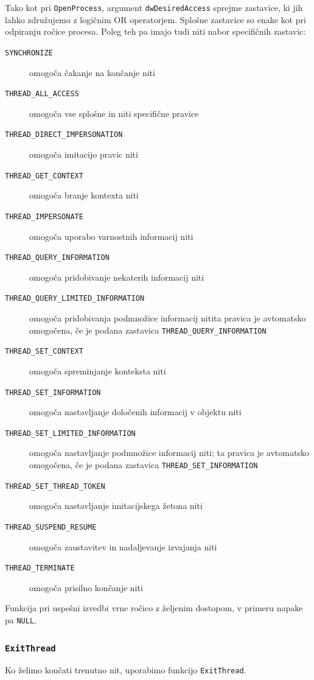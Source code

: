 \documentclass[a4paper,12pt,openright]{book}
\begin{document}
Tako kot pri \texttt{OpenProcess}, argument \texttt{dwDesiredAccess} sprejme zastavice, ki jih lahko združujemo z logičnim OR operatorjem.
Splošne zastavice so enake kot pri odpiranju ročice procesa.
Poleg teh pa imajo tudi niti nabor specifičnih zastavic:
\begin{description}
	\item[\texttt{SYNCHRONIZE}] omogoča čakanje na končanje niti
	\item[\texttt{THREAD\_ALL\_ACCESS}] omogoča vse splošne in niti specifične pravice
	\item[\texttt{THREAD\_DIRECT\_IMPERSONATION}] omogoča imitacijo pravic niti 
	\item[\texttt{THREAD\_GET\_CONTEXT}] omogoča branje kontexta niti
	\item[\texttt{THREAD\_IMPERSONATE}] omogoča uporabo varnostnih informacij niti
	\item[\texttt{THREAD\_QUERY\_INFORMATION}] omogoča pridobivanje nekaterih informacij niti
	\item[\texttt{THREAD\_QUERY\_LIMITED\_INFORMATION}] omogoča pridobivanja podmnožice informacij nitita pravica je avtomatsko omogočena, če je podana zastavica \texttt{THREAD\_QUERY\_INFORMATION}
	\item[\texttt{THREAD\_SET\_CONTEXT}] omogoča spreminjanje konteksta niti
	\item[\texttt{THREAD\_SET\_INFORMATION}] omogoča nastavljanje določenih informacij v objektu niti
	\item[\texttt{THREAD\_SET\_LIMITED\_INFORMATION}] omogoča nastavljanje podmnožice informacij niti; ta pravica je avtomatsko omogočena, če je podana zastavica \texttt{THREAD\_SET\_INFORMATION}
	\item[\texttt{THREAD\_SET\_THREAD\_TOKEN}] omogoča nastavljanje imitacijskega žetona niti
	\item[\texttt{THREAD\_SUSPEND\_RESUME}] omogoča zaustavitev in nadaljevanje izvajanja niti
	\item[\texttt{THREAD\_TERMINATE}] omogoča prisilno končanje niti
\end{description}

Funkcija pri uspešni izvedbi vrne ročico z željenim dostopom, v primeru napake pa \texttt{NULL}.

\subsubsection{\texttt{ExitThread}}

Ko želimo končati trenutno nit, uporabimo funkcijo \texttt{ExitThread}.
\end{document}
